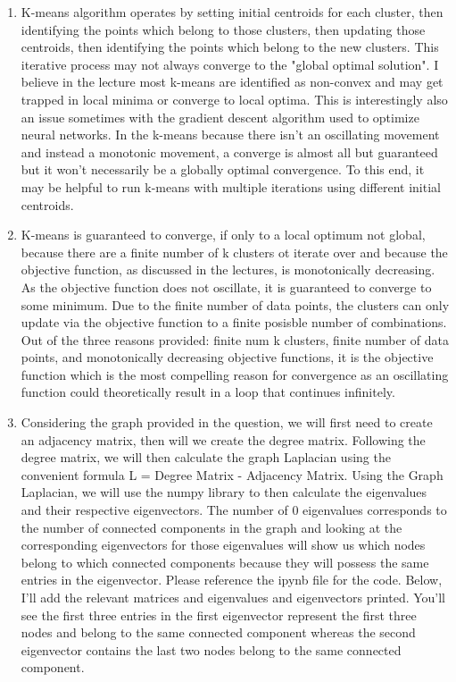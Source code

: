 \documentclass{article}
\begin{document}
\begin{enumerate}
\item K-means algorithm operates by setting initial centroids for each cluster, then identifying the points
which belong to those clusters, then updating those centroids, then identifying the points which belong to
the new clusters. This iterative process may not always converge to the "global optimal solution". I believe
in the lecture most k-means are identified as non-convex and may get trapped in local minima or converge to
local optima. This is interestingly also an issue sometimes with the gradient descent algorithm used to optimize
neural networks. In the k-means because there isn't an oscillating movement and instead a monotonic movement,
a converge is almost all but guaranteed but it won't necessarily be a globally optimal convergence. To this end,
it may be helpful to run k-means with multiple iterations using different initial centroids.

\item K-means is guaranteed to converge, if only to a local optimum not global, because there are a finite
number of k clusters ot iterate over and because the objective function, as discussed in the lectures, is
monotonically decreasing. As the objective function does not oscillate, it is guaranteed to converge to some
minimum. Due to the finite number of data points, the clusters can only update via the objective function
to a finite posisble number of combinations. Out of the three reasons provided: finite num k clusters, finite
number of data points, and monotonically decreasing objective functions, it is the objective function which
is the most compelling reason for convergence as an oscillating function could theoretically result in a loop
that continues infinitely.

\item Considering the graph provided in the question, we will first need to create an adjacency matrix,
then will we create the degree matrix. Following the degree matrix, we will then calculate the
graph Laplacian using the convenient formula L = Degree Matrix - Adjacency Matrix. Using the Graph
Laplacian, we will use the numpy library to then calculate the eigenvalues and their respective eigenvectors.
The number of 0 eigenvalues corresponds to the number of connected components in the graph and looking
at the corresponding eigenvectors for those eigenvalues will show us which nodes belong to which connected
components because they will possess the same entries in the eigenvector. Please reference the ipynb file
for the code. Below, I'll add the relevant matrices and eigenvalues and eigenvectors printed. You'll see
the first three entries in the first eigenvector represent the first three nodes and belong to the same
connected component whereas the second eigenvector contains the last two nodes belong to the same connected
component.


\end{enumerate}
\end{document}
